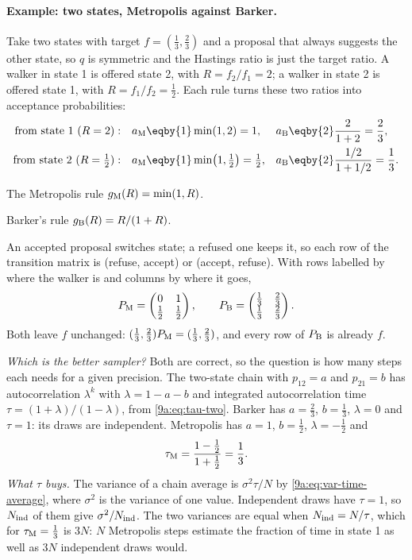 \paragraph{Example: two states, Metropolis against Barker.}
Take two states with target $f=(\tfrac13,\tfrac23)$ and a proposal that always suggests the
other state, so $q$ is symmetric and the Hastings ratio is just the target ratio. A walker in
state 1 is offered state 2, with $R=f_2/f_1=2$; a walker in state 2 is offered state 1, with
$R=f_1/f_2=\tfrac12$. Each rule turns these two ratios into acceptance probabilities:
\begin{align*}
  \text{from state 1 }(R=2):&\quad a_{\rm M}\eqby{1}\min(1,2)=1,
  &a_{\rm B}&\eqby{2}\frac{2}{1+2}=\frac23,\\
  \text{from state 2 }(R=\tfrac12):&\quad a_{\rm M}\eqby{1}\min\bigl(1,\tfrac12\bigr)=\tfrac12,
  &a_{\rm B}&\eqby{2}\frac{1/2}{1+1/2}=\frac13 .
\end{align*}
\begin{explain}
  \item The Metropolis rule $g_{\rm M}(R)=\min(1,R)$.
  \item Barker's rule $g_{\rm B}(R)=R/(1+R)$.
\end{explain}
An accepted proposal switches state; a refused one keeps it, so each row of the transition
matrix is (refuse, accept) or (accept, refuse). With rows labelled by where the walker is and
columns by where it goes,
\begin{equation*}
  P_{\rm M}=\begin{pmatrix}0&1\\ \tfrac12&\tfrac12\end{pmatrix},
  \qquad
  P_{\rm B}=\begin{pmatrix}\tfrac13&\tfrac23\\ \tfrac13&\tfrac23\end{pmatrix}.
\end{equation*}
Both leave $f$ unchanged: $(\tfrac13,\tfrac23)P_{\rm M}=(\tfrac13,\tfrac23)$, and every row of
$P_{\rm B}$ is already $f$.

\emph{Which is the better sampler?} Both are correct, so the question is how many steps each
needs for a given precision. The two-state chain with $p_{12}=a$ and $p_{21}=b$ has
autocorrelation $\lambda^k$ with $\lambda=1-a-b$ and integrated autocorrelation time
$\tau=(1+\lambda)/(1-\lambda)$, from \eqref{9a:eq:tau-two}. Barker has $a=\tfrac23$,
$b=\tfrac13$, $\lambda=0$ and $\tau=1$: its draws are independent. Metropolis has $a=1$,
$b=\tfrac12$, $\lambda=-\tfrac12$ and
\begin{equation*}
  \tau_{\rm M}=\frac{1-\tfrac12}{1+\tfrac12}=\frac13 .
\end{equation*}
\emph{What $\tau$ buys.} The variance of a chain average is $\sigma^2\tau/N$ by
\eqref{9a:eq:var-time-average}, where $\sigma^2$ is the variance of one value. Independent draws
have $\tau=1$, so $N_{\rm ind}$ of them give $\sigma^2/N_{\rm ind}$. The two variances are equal
when $N_{\rm ind}=N/\tau$, which for $\tau_{\rm M}=\tfrac13$ is $3N$: $N$ Metropolis steps
estimate the fraction of time in state 1 as well as $3N$ independent draws would.

